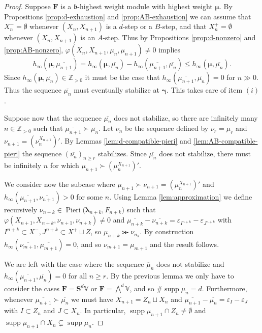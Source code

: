 \documentclass[11pt,fleqn]{amsart}
\newcommand\ZZ{\mathbb Z}
\renewcommand\phi{\varphi}
\renewcommand\epsilon{\varepsilon}
\theoremstyle{definition}
\theoremstyle{remark}
\theoremstyle{remark}
\newcommand\VV{\mathbb V}
\renewcommand\SS{\mathbf S}
\newcommand\lie[1]{\mathfrak{#1}}
\newcommand\wt[1]{\boldsymbol{#1}}
\DeclareMathOperator\supp{supp}
\newcommand\Pieri[2]{\operatorname{Pieri}{(#1},{#2)}}
\newcommand\map[4]{\phi(#3,#4,#1,#2)}
\begin{document}
\begin{proof}
Suppose $\mathbf F$ is a $\lie b$-highest weight module with highest 
weight $\wt\mu$. By Propositions \ref{prop:d-exhaustion} and 
\ref{prop:AB-exhaustion} we can assume that $X_n^- = \emptyset$ whenever 
$(X_n,X_{n+1})$ is a $d$-step or a $B$-step, and that $X^+_n = \emptyset$ 
whenever $(X_n,X_{n+1})$ is an $A$-step. Thus by Propositions 
\ref{prop:d-nonzero} and \ref{prop:AB-nonzero}, $\map{\mu_n}{\mu_{n+1}}{X_n}
{X_{n+1}} \neq 0$ implies 
\[
  h_\infty(\wt\mu,\overline{\mu_{n+1}})
    = h_\infty(\wt\mu,\overline{\mu_n}) - 
      h_\infty(\overline{\mu_{n+1}},\overline{\mu_n})
    \leq h_\infty(\wt\mu,\overline{\mu_n}).
\]
Since $h_{\infty}(\wt\mu,\overline{\mu_n}) \in \ZZ_{>0}$ it must be the case 
that $h_{\infty}(\overline{\mu_{n+1}},\overline{\mu_n}) = 0$ for $n \gg 0$. 
Thus the sequence $\overline{\mu_n}$ must eventually stabilize at $\wt\gamma$. 
This takes care of item $(i)$.

Suppose now that the sequence $\overline{\mu_n}$ does not stabilize, so there 
are infinitely many $n \in \ZZ_{>0}$ such that $\overline{\mu_{n+1}} \succ 
\overline{\mu_n}$. Let $\nu_n$ be the sequence defined by $\nu_r = 
\mu_r$ and $\nu_{n+1} = (\nu_n^{X_{n+1}})'$. By Lemmas 
\ref{lem:d-compatible-pieri} and \ref{lem:AB-compatible-pieri} the sequence
$(\overline{\nu_n})_{n\geq r}$ stabilizes. Since $\overline{\mu_n}$ does not 
stabilize, there must be infinitely $n$ for which $\mu_{n+1} \succ 
(\mu_n^{X_{n+1}})'$.

We consider now the subcase where $\mu_{n+1} \succ \nu_{n+1} = 
(\mu_n^{X_{n+1}})'$ and $h_\infty(\overline{\mu_{n+1}}, \overline{\nu_{n+1}})
> 0$ for some $n$. Using Lemma \ref{lem:approximation} we define recursively 
$\nu_{n+k} \in \Pieri{\wt\lambda_{n+k}}{F_{n+k}}$ such that $\map{\nu_{n+1}}
{\nu_{n+k}}{X_{n+1}}{X_{n+k}} \neq 0$ and $\overline{\mu_{n+k}} - \overline
{\nu_{n+k}} = \epsilon_{I^{n+k}} - \epsilon_{J^{n+k}}$ with $I^{n+k} \subset 
X^-, J^{n+k} \subset X^+ \sqcup Z$, so $\mu_{n+k} \ggcurly \nu_{n_k}$. By 
construction $h_\infty(\overline{\nu_{m+1}}, \overline{\mu_{m+1}}) = 0$, and so 
$\nu_{m+1} = \mu_{m+1}$ and the result follows.

We are left with the case where the sequence $\overline\mu_n$ does not 
stabilize and $h_\infty(\overline{\mu_{n+1}}, \overline{\mu_n}) = 0$
for all $n \geq r$. By the previous lemma we only have to consider the cases 
$\mathbf F = \SS^d\VV$ or $\mathbf F = \bigwedge^d \VV$, and so $\# \supp 
\mu_n = d$. Furthermore, whenever $\overline{\mu_{n+1}} \succ \overline{\mu_n}$ 
we must have $X_{n+1} = Z_n \sqcup X_n$ and $\overline{\mu_{n+1}} - 
\overline{\mu_n} = \epsilon_I - \epsilon_J$ with $I \subset Z_n$ and $J 
\subset X_n$. In particular, $\supp \mu_{n+1} \cap Z_n \neq \emptyset$ and 
$\supp \mu_{n+1} \cap X_n \subsetneq \supp \mu_n$.


\end{proof}
\end{document}
